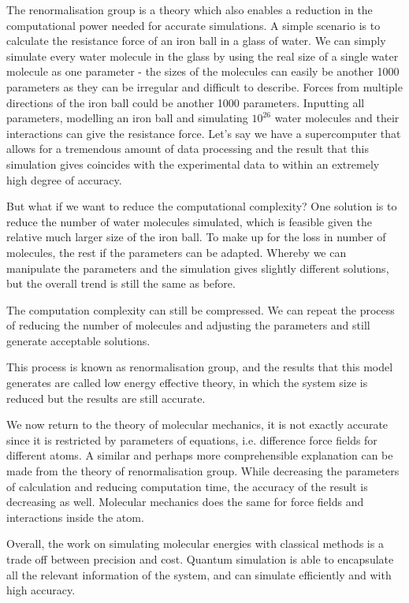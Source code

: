 \documentclass[12pt]{article}
\begin{document}
The renormalisation group is a theory which also enables a reduction in the computational power needed for accurate simulations. A simple scenario
is to calculate the resistance force of an iron ball in a glass of water. We can simply simulate every water molecule in the glass by using the
 real size of a single water molecule as one parameter - the sizes of the molecules can easily be another 1000 parameters as they can be
 irregular and difficult to describe. Forces from multiple directions of the iron ball could be another 1000 parameters. Inputting all parameters,
  modelling an iron ball and simulating $10^{26}$ water molecules and their interactions can give the resistance force. Let’s say we have a
  supercomputer that allows for a tremendous amount of data processing and the result that this simulation gives coincides with the experimental data
  to within an extremely high degree of accuracy.

But what if we want to reduce the computational complexity? One solution is to reduce the number of water molecules simulated, which is feasible given
 the relative much larger size of the iron ball. To make up for the loss in number of molecules, the rest if the parameters can be adapted. Whereby we
can manipulate the parameters and the simulation gives slightly different solutions, but the overall trend is still the same as before.

The computation complexity can still be compressed. We can repeat the process of reducing the number of molecules and adjusting the parameters
 and still generate acceptable solutions.

This process is known as renormalisation group, and the results that this model generates are called low energy effective theory, in which the system
 size is reduced but the results are still accurate.

We now return to the theory of molecular mechanics, it is not exactly accurate since it is restricted by parameters of equations, i.e. difference
force fields for different atoms. A similar and perhaps more comprehensible explanation can be made from the theory of renormalisation group.
While decreasing the parameters of calculation and reducing computation time, the accuracy of the result is decreasing as well. Molecular mechanics
 does the same for force fields and interactions inside the atom.

Overall, the work on simulating molecular energies with classical methods is a trade off between precision and cost. Quantum simulation is able
to encapsulate all the relevant information of the system, and can simulate efficiently and with high accuracy.
\end{document}
